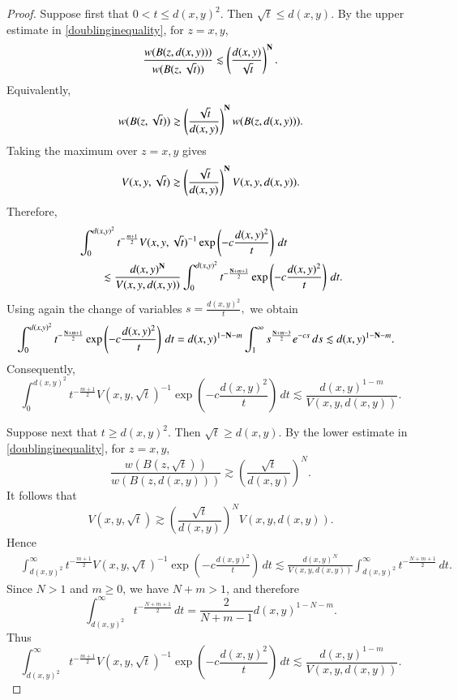 \documentclass[12pt]{amsart}
\begin{document}
\begin{proof}
Suppose first that
$
0<t\leq d(x,y)^2.
$
Then $\sqrt t\leq d(x,y)$. By the upper estimate in
\eqref{doublinginequality}, for $z=x,y$,
\[
\frac{w(B(z,d(x,y)))}
{w(B(z,\sqrt t))}
\lesssim
\left(
\frac{d(x,y)}{\sqrt t}
\right)^{\bf N}.
\]
Equivalently,
\[
w(B(z,\sqrt t))
\gtrsim
\left(
\frac{\sqrt t}{d(x,y)}
\right)^{\bf N}
w(B(z,d(x,y))).
\]
Taking the maximum over $z=x,y$ gives
\begin{equation}\label{eq:V-small-scale-comparison}
V(x,y,\sqrt t)
\gtrsim
\left(
\frac{\sqrt t}{d(x,y)}
\right)^{\bf N}
V(x,y,d(x,y)).
\end{equation}
Therefore,
\begin{align*}
&\int_0^{d(x,y)^2}
t^{-\frac{m+1}{2}}
V(x,y,\sqrt t)^{-1}
\exp\left(
-c\frac{d(x,y)^2}{t}
\right)\,dt
\\
&\qquad\lesssim
\frac{d(x,y)^{\bf N}}{V(x,y,d(x,y))}
\int_0^{d(x,y)^2}
t^{-\frac{{\bf N}+m+1}{2}}
\exp\left(
-c\frac{d(x,y)^2}{t}
\right)\,dt.
\end{align*}
Using again the change of variables
$
s=\frac{d(x,y)^2}{t},
$
we obtain
\begin{align*}
&\int_0^{d(x,y)^2}
t^{-\frac{{\bf N}+m+1}{2}}
\exp\left(
-c\frac{d(x,y)^2}{t}
\right)\,dt=
d(x,y)^{1-{\bf N}-m}
\int_1^\infty
s^{\frac{{\bf N}+m-3}{2}}e^{-cs}\,ds\lesssim
d(x,y)^{1-{\bf N}-m}.
\end{align*}
Consequently,
\begin{equation}\label{eq:K-small-time-localized}
\int_0^{d(x,y)^2}
t^{-\frac{m+1}{2}}
V(x,y,\sqrt t)^{-1}
\exp\left(
-c\frac{d(x,y)^2}{t}
\right)\,dt
\lesssim
\frac{d(x,y)^{1-m}}{V(x,y,d(x,y))}.
\end{equation}

Suppose next that
$
t\geq d(x,y)^2.
$
Then $\sqrt t\geq d(x,y)$. By the lower estimate in
\eqref{doublinginequality}, for $z=x,y$,
\[
\frac{w(B(z,\sqrt t))}
{w(B(z,d(x,y)))}
\gtrsim
\left(
\frac{\sqrt t}{d(x,y)}
\right)^N.
\]
It follows that
\begin{equation}\label{eq:V-large-scale-comparison}
V(x,y,\sqrt t)
\gtrsim
\left(
\frac{\sqrt t}{d(x,y)}
\right)^N
V(x,y,d(x,y)).
\end{equation}
Hence
\begin{align*}
&\int_{d(x,y)^2}^{\infty}
t^{-\frac{m+1}{2}}
V(x,y,\sqrt t)^{-1}
\exp\left(
-c\frac{d(x,y)^2}{t}
\right)\,dt\lesssim
\frac{d(x,y)^N}{V(x,y,d(x,y))}
\int_{d(x,y)^2}^{\infty}
t^{-\frac{N+m+1}{2}}\,dt.
\end{align*}
Since $N>1$ and $m\geq0$, we have $N+m>1$, and therefore
\[
\int_{d(x,y)^2}^{\infty}
t^{-\frac{N+m+1}{2}}\,dt
=
\frac{2}{N+m-1}
d(x,y)^{1-N-m}.
\]
Thus
\begin{equation}\label{eq:K-large-time-localized}
\int_{d(x,y)^2}^{\infty}
t^{-\frac{m+1}{2}}
V(x,y,\sqrt t)^{-1}
\exp\left(
-c\frac{d(x,y)^2}{t}
\right)\,dt
\lesssim
\frac{d(x,y)^{1-m}}{V(x,y,d(x,y))}.
\end{equation}


\end{proof}
\end{document}

